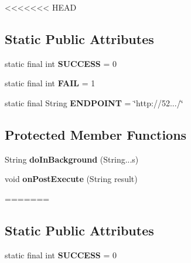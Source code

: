 \begin{DoxyCompactItemize}
\begin{DoxyCompactItemize}
\end{DoxyCompactItemize}
<<<<<<< HEAD
\subsection*{Static Public Attributes}
\begin{DoxyCompactItemize}
\item 
\hypertarget{classcom_1_1example_1_1sel_1_1lostfound_1_1ScriptRunner_af663271a5e699ad47264102b5445799e}{static final int {\bfseries S\-U\-C\-C\-E\-S\-S} = 0}\label{classcom_1_1example_1_1sel_1_1lostfound_1_1ScriptRunner_af663271a5e699ad47264102b5445799e}

\item 
\hypertarget{classcom_1_1example_1_1sel_1_1lostfound_1_1ScriptRunner_af872e324d4d349db617f9511009901a9}{static final int {\bfseries F\-A\-I\-L} = 1}\label{classcom_1_1example_1_1sel_1_1lostfound_1_1ScriptRunner_af872e324d4d349db617f9511009901a9}

\item 
\hypertarget{classcom_1_1example_1_1sel_1_1lostfound_1_1ScriptRunner_a6b8f5d1e77298c2f260fd7ef9502650d}{static final String {\bfseries E\-N\-D\-P\-O\-I\-N\-T} = \char`\"{}http\-://52.../\char`\"{}}\label{classcom_1_1example_1_1sel_1_1lostfound_1_1ScriptRunner_a6b8f5d1e77298c2f260fd7ef9502650d}

\end{DoxyCompactItemize}
\subsection*{Protected Member Functions}
\begin{DoxyCompactItemize}
\item 
\hypertarget{classcom_1_1example_1_1sel_1_1lostfound_1_1ScriptRunner_a9050c944957b5b8fcacc9d2cba6f3b71}{String {\bfseries do\-In\-Background} (String...\-s)}\label{classcom_1_1example_1_1sel_1_1lostfound_1_1ScriptRunner_a9050c944957b5b8fcacc9d2cba6f3b71}

\item 
\hypertarget{classcom_1_1example_1_1sel_1_1lostfound_1_1ScriptRunner_affce5629df2ecd60a45f3c707b996955}{void {\bfseries on\-Post\-Execute} (String result)}\label{classcom_1_1example_1_1sel_1_1lostfound_1_1ScriptRunner_affce5629df2ecd60a45f3c707b996955}
=======
\subsection*{\-Static \-Public \-Attributes}
\begin{DoxyCompactItemize}
\item 
\hypertarget{classcom_1_1example_1_1sel_1_1lostfound_1_1ScriptRunner_af663271a5e699ad47264102b5445799e}{static final int {\bfseries \-S\-U\-C\-C\-E\-S\-S} = 0}\label{classcom_1_1example_1_1sel_1_1lostfound_1_1ScriptRunner_af663271a5e699ad47264102b5445799e}


\end{DoxyCompactItemize}
\end{DoxyCompactItemize}
\end{DoxyCompactItemize}

